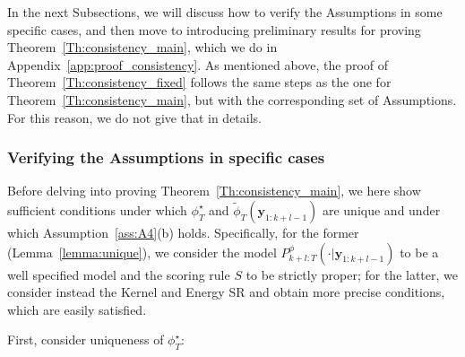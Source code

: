 \documentclass[twoside,11pt]{article}
\newcommand{\ddobsupkplusl}{\mathbf{y}_{1:k+l-1}}
\begin{document}
	
	
	
	
	
	
	
	
	
	
	
	
	In the next Subsections, we will discuss how to verify the Assumptions in some specific cases, and then move to introducing preliminary results for proving Theorem~\ref{Th:consistency_main}, which we do in Appendix~\ref{app:proof_consistency}. As mentioned above, the proof of Theorem~\ref{Th:consistency_fixed} follows the same steps as the one for Theorem~\ref{Th:consistency_main}, but with the corresponding set of Assumptions. For this reason, we do not give that in details.
	
	\subsubsection{Verifying the Assumptions in specific cases}\label{app:boundedness_SRs}
	
	Before delving into proving Theorem~\ref{Th:consistency_main}, we here show sufficient conditions under which $ \phi^\star_T $ and $ \tilde \phi_T(\ddobsupkplusl) $ are unique and under which Assumption~\ref{ass:A4}(b) holds. Specifically, for the former (Lemma~\ref{lemma:unique}), we consider the model $ P^\phi_{k+l:T}(\cdot|\ddobsupkplusl) $ to be a well specified model and the scoring rule $ S $ to be strictly proper; for the latter, we consider instead the Kernel and Energy SR and obtain more precise conditions, which are easily satisfied.
	
	
	First, consider uniqueness of $ \phi^\star_T $:
	
\end{document}

